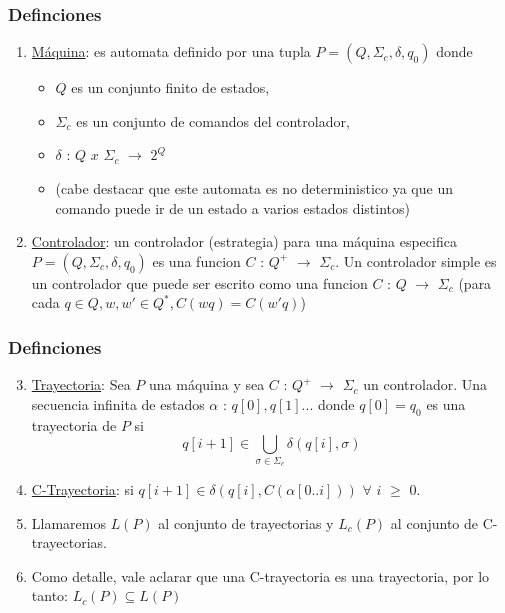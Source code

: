 \begin{frame}[plain]
\frametitle{Definciones}
\begin{enumerate}
   \item \underline{Máquina}: es automata definido por una tupla $P = (Q,\Sigma_c,\delta,q_0)$ donde 
   \begin{itemize}
      \item $Q$ es un conjunto finito de estados, 
      \item $\Sigma_c$ es un conjunto de comandos del controlador,
      \item $\delta$ : $Q$ $x$ $\Sigma_c$ $\rightarrow$ $2^Q$
      \item (cabe destacar que este automata es no deterministico ya que un comando puede ir de un estado a varios estados distintos)
   \end{itemize}
\vspace{3 mm}
   \item \underline{Controlador}: un controlador (estrategia) para una máquina especifica $P = (Q,\Sigma_c,\delta,q_0)$ es una funcion $C$ : $Q^+$ $\rightarrow$ $\Sigma_c$. Un controlador simple es un controlador que puede ser escrito como una funcion $C$ : $Q$ $\rightarrow$ $\Sigma_c$ (para cada $q \in Q, w, w' \in Q^*, C(wq) = C(w'q)$)
\end{enumerate}
\end{frame}

\begin{frame}[plain]
\frametitle{Definciones}
\begin{enumerate}
   \setcounter{enumi}{2}
   \item \underline{Trayectoria}: Sea $P$ una máquina y sea $C$ : $Q^+$ $\rightarrow$ $\Sigma_c$ un controlador. Una secuencia infinita de estados $\alpha$ : $q[0], q[1] ...$ donde $q[0] = q_0$ es una trayectoria de $P$ si
   \begin{equation}
      q[i+1] \in \bigcup_{\sigma \in \Sigma_c} \delta(q[i],\sigma)
   \end{equation}
\vspace{3 mm}
   \item \underline{C-Trayectoria}: si $q[i+1] \in \delta(q[i], C(\alpha[0..i]))$ $\forall$ $i$ $\geq$ $0$.
\vspace{3 mm}
   \item Llamaremos $L(P)$ al conjunto de trayectorias y $L_c(P)$ al conjunto de C-trayectorias.
\vspace{3 mm}
   \item Como detalle, vale aclarar que una C-trayectoria es una trayectoria, por lo tanto: $L_c(P) \subseteq L(P)$
\end{enumerate}
\end{frame}

